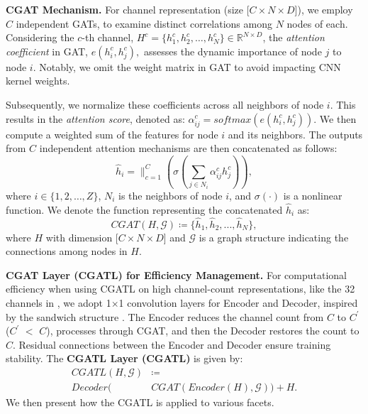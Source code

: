 \documentclass[letterpaper]{article} %
\begin{document}
\noindent \textbf{CGAT Mechanism.}
For channel representation (size [$C \times N \times D$]), we employ $C$ independent GATs, to examine distinct correlations among $N$ nodes of each. Considering the $c$-th channel, $H^{c}=\{h^{c}_{1},h^{c}_{2},\dots,h^{c}_{N}\} \in \mathbb{R}^{N \times D}$, the \textit{attention coefficient} in GAT,
\begin{math}
e(h^{c}_{i},h^{c}_{j}),
\end{math}
assesses the dynamic importance of node $j$ to node $i$. Notably, we omit the weight matrix in GAT \cite{velivckovic2018graph,brody2022how} to avoid impacting CNN kernel weights.

Subsequently, we normalize these coefficients across all neighbors of node $i$. This results in the \textit{attention score}, denoted as: $\alpha^{c}_{ij} = softmax(e(h^{c}_{i},h^{c}_{j}))$. We then compute a weighted sum of the features for node $i$ and its neighbors. The outputs from $C$ independent attention mechanisms are then concatenated as follows:
\begin{equation}
\hat{h}_{i}=\|_{c=1}^{C}(\sigma(\sum_{j \in N_{i}}\alpha^{c}_{ij}{h}^{c}_{j})),
\label{eq:channel_concat}
\end{equation}
where $i\in \{1,2,\dots,Z\}$, $N_{i}$ is the neighbors of node $i$, and $\sigma(\cdot)$ is a nonlinear function. We denote the function representing the concatenated $\hat{h}_{i}$ as:
\begin{equation}
CGAT(H,\mathcal{G}) \coloneqq \{\hat{h}_{1},\hat{h}_{2},...,\hat{h}_{N}\},
\label{eq:mgat}
\end{equation}
where $H$ with dimension [$C \times N \times D$] and $\mathcal{G}$ is a graph structure indicating the connections among nodes in $H$.

\noindent \textbf{CGAT Layer (CGATL) for Efficiency Management.}
For computational efficiency when using CGATL on high channel-count representations, like the 32 channels in \cite{wu2020connecting}, we adopt 1$\times$1 convolution layers for Encoder and Decoder, inspired by the sandwich structure \cite{yu2018spatio}. The Encoder reduces the channel count from $C$ to $C^{'}$ ($C^{'}$ $<$ $C$), processes through CGAT, and then the Decoder restores the count to $C$. Residual connections between the Encoder and Decoder ensure training stability. The \textbf{CGATL Layer (CGATL)} is given by:
\begin{align}
CGATL(H,\mathcal{G}) &\coloneqq \nonumber \\
Decoder(&CGAT(Encoder(H),\mathcal{G})) + H.
\label{eq:all_channel_aggregation_symbol}
\end{align}
We then present how the CGATL is applied to various facets.
\end{document}
